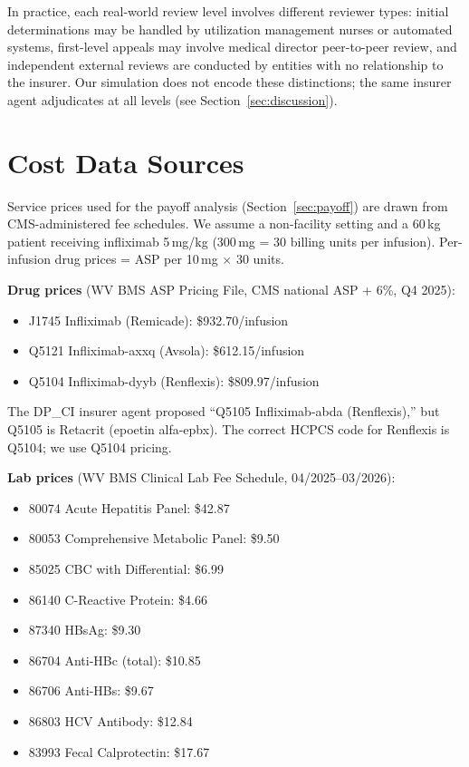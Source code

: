 In practice, each real-world review level involves different reviewer types: initial determinations may be handled by utilization management nurses or automated systems, first-level appeals may involve medical director peer-to-peer review, and independent external reviews are conducted by entities with no relationship to the insurer. Our simulation does not encode these distinctions; the same insurer agent adjudicates at all levels (see Section~\ref{sec:discussion}).

\section{Cost Data Sources}
\label{sec:cost-data}

Service prices used for the payoff analysis (Section~\ref{sec:payoff}) are drawn from CMS-administered fee schedules. We assume a non-facility setting and a 60\,kg patient receiving infliximab 5\,mg/kg (300\,mg = 30 billing units per infusion). Per-infusion drug prices = ASP per 10\,mg $\times$ 30 units.

\textbf{Drug prices} (WV BMS ASP Pricing File, CMS national ASP + 6\%, Q4 2025):
\begin{itemize}
  \item J1745 Infliximab (Remicade): \$932.70/infusion
  \item Q5121 Infliximab-axxq (Avsola): \$612.15/infusion
  \item Q5104 Infliximab-dyyb (Renflexis): \$809.97/infusion
\end{itemize}

The DP\_CI insurer agent proposed ``Q5105 Infliximab-abda (Renflexis),'' but Q5105 is Retacrit (epoetin alfa-epbx). The correct HCPCS code for Renflexis is Q5104; we use Q5104 pricing.

\textbf{Lab prices} (WV BMS Clinical Lab Fee Schedule, 04/2025--03/2026):
\begin{itemize}
  \item 80074 Acute Hepatitis Panel: \$42.87
  \item 80053 Comprehensive Metabolic Panel: \$9.50
  \item 85025 CBC with Differential: \$6.99
  \item 86140 C-Reactive Protein: \$4.66
  \item 87340 HBsAg: \$9.30
  \item 86704 Anti-HBc (total): \$10.85
  \item 86706 Anti-HBs: \$9.67
  \item 86803 HCV Antibody: \$12.84
  \item 83993 Fecal Calprotectin: \$17.67
\end{itemize}

